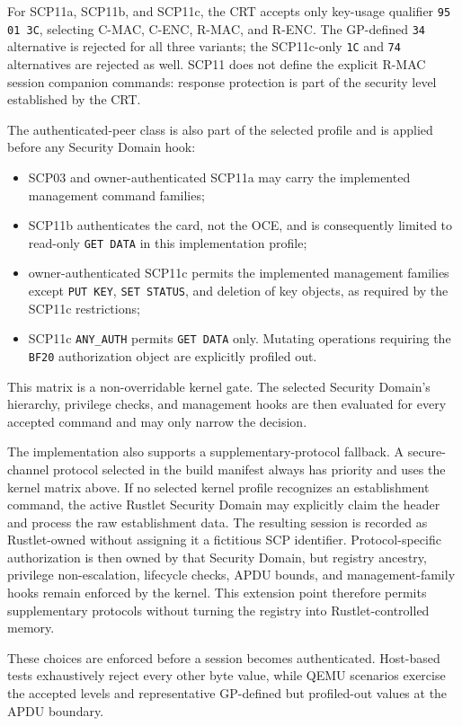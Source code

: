 For SCP11a, SCP11b, and SCP11c, the CRT accepts only key-usage qualifier
\texttt{95 01 3C}, selecting C-MAC, C-ENC, R-MAC, and R-ENC. The GP-defined
\texttt{34} alternative is rejected for all three variants; the SCP11c-only
\texttt{1C} and \texttt{74} alternatives are rejected as well. SCP11 does not
define the explicit R-MAC session companion commands: response protection is
part of the security level established by the CRT.

The authenticated-peer class is also part of the selected profile and is
applied before any Security Domain hook:
\begin{itemize}
\item SCP03 and owner-authenticated SCP11a may carry the implemented
      management command families;
\item SCP11b authenticates the card, not the OCE, and is consequently limited
      to read-only \texttt{GET DATA} in this implementation profile;
\item owner-authenticated SCP11c permits the implemented management families
      except \texttt{PUT KEY}, \texttt{SET STATUS}, and deletion of key
      objects, as required by the SCP11c restrictions;
\item SCP11c \texttt{ANY\_AUTH} permits \texttt{GET DATA} only. Mutating
      operations requiring the \texttt{BF20} authorization object are
      explicitly profiled out.
\end{itemize}
This matrix is a non-overridable kernel gate. The selected Security Domain's
hierarchy, privilege checks, and management hooks are then evaluated for every
accepted command and may only narrow the decision.

The implementation also supports a supplementary-protocol fallback. A
secure-channel protocol selected in the build manifest always has priority and
uses the kernel matrix above. If no selected kernel profile recognizes an
establishment command, the active Rustlet Security Domain may explicitly claim
the header and process the raw establishment data. The resulting session is
recorded as Rustlet-owned without assigning it a fictitious SCP identifier.
Protocol-specific authorization is then owned by that Security Domain, but
registry ancestry, privilege non-escalation, lifecycle checks, APDU bounds, and
management-family hooks remain enforced by the kernel. This extension point
therefore permits supplementary protocols without turning the registry into
Rustlet-controlled memory.

These choices are enforced before a session becomes authenticated. Host-based
tests exhaustively reject every other byte value, while QEMU scenarios exercise
the accepted levels and representative GP-defined but profiled-out values at
the APDU boundary.

